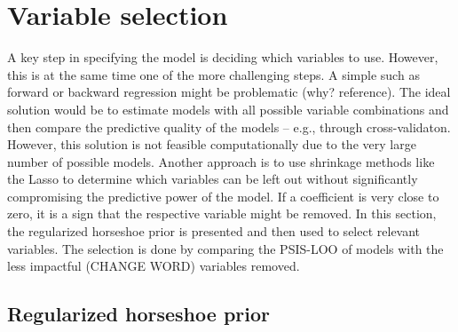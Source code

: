 \section{Variable selection}

A key step in specifying the model is deciding which variables to use.
However, this is at the same time one of the more challenging steps.
A simple such as forward or backward regression might be problematic (why? reference).
The ideal solution would be to estimate models with all possible variable combinations and then compare the predictive quality of the models – e.g., through cross-validaton.
However, this solution is not feasible computationally due to the very large number of possible models.
Another approach is to use shrinkage methods like the Lasso \citep{tibshirani_regression_1996} to determine which variables can be left out without significantly compromising the predictive power of the model.
If a coefficient is very close to zero, it is a sign that the respective variable might be removed.
In this section, the regularized horseshoe prior \citep{piironen_sparsity_2017} is presented and then used to select relevant variables. The selection is done by comparing the PSIS-LOO of models with the less impactful (CHANGE WORD) variables removed.

\subsection{Regularized horseshoe prior}

